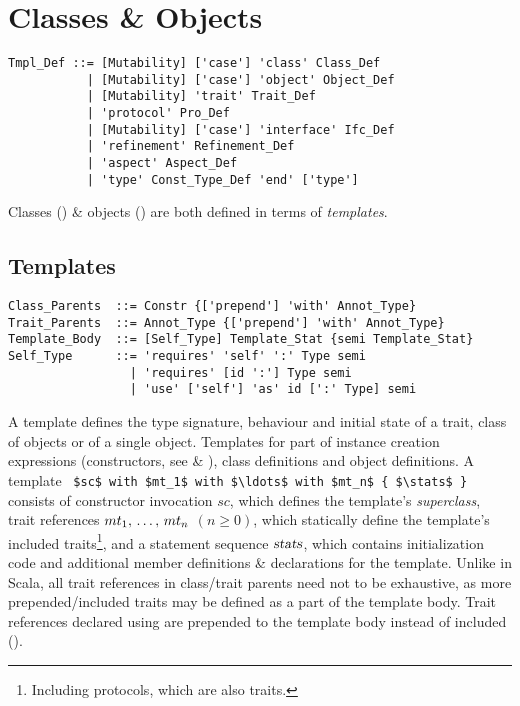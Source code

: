 
\chapter{Classes \& Objects}

\syntax\begin{lstlisting}
Tmpl_Def ::= [Mutability] ['case'] 'class' Class_Def
           | [Mutability] ['case'] 'object' Object_Def
           | [Mutability] 'trait' Trait_Def
           | 'protocol' Pro_Def
           | [Mutability] ['case'] 'interface' Ifc_Def
           | 'refinement' Refinement_Def
           | 'aspect' Aspect_Def
           | 'type' Const_Type_Def 'end' ['type']
\end{lstlisting}

Classes () \& objects () are both defined in terms of {\em templates}. 





\section{Templates}
\label{sec:templates}

\syntax\begin{lstlisting}
Class_Parents  ::= Constr {['prepend'] 'with' Annot_Type} 
Trait_Parents  ::= Annot_Type {['prepend'] 'with' Annot_Type}
Template_Body  ::= [Self_Type] Template_Stat {semi Template_Stat}
Self_Type      ::= 'requires' 'self' ':' Type semi
                 | 'requires' [id ':'] Type semi
                 | 'use' ['self'] 'as' id [':' Type] semi
\end{lstlisting}

A template defines the type signature, behaviour and initial state of a trait, class of objects or of a single object. Templates for part of instance creation expressions (constructors, see  \& ), class definitions and object definitions. A template ~\lstinline!$sc$ with $mt_1$ with $\ldots$ with $mt_n$ { $\stats$ }!~ consists of constructor invocation $sc$, which defines the template's {\em superclass}, trait references $mt_1 ,\, \ldots ,\, mt_n$ $(n \geq 0)$, which statically define the template's included traits\footnote{Including protocols, which are also traits.}, and a statement sequence $\mbox{\sl stats}$, which contains initialization code and additional member definitions \& declarations for the template. Unlike in Scala, all trait references in class/trait parents need not to be exhaustive, as more prepended/included traits may be defined as a part of the template body. Trait references declared using  are prepended to the template body instead of included (). 

